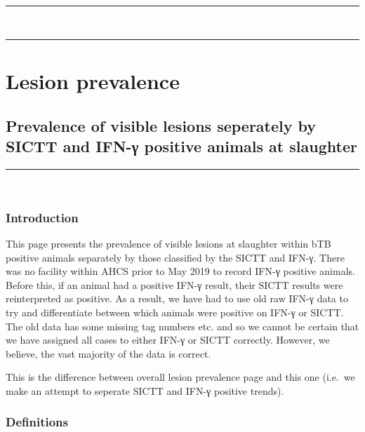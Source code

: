 \documentclass[
  letterpaper,
  DIV=11,
  numbers=noendperiod]{scrreprt}
\begin{document}
\(~\) \(~\)

\begin{center}\rule{0.5\linewidth}{0.5pt}\end{center}

\(~\) \(~\)

\begin{center}\rule{0.5\linewidth}{0.5pt}\end{center}

\part{Lesion prevalence}

\chapter{Prevalence of visible lesions seperately by SICTT and IFN-γ
positive animals at slaughter}\label{sec-btblesions}

\begin{center}\rule{0.5\linewidth}{0.5pt}\end{center}

\(~\) \(~\)

\newpage

\section{Introduction}\label{introduction}

This page presents the prevalence of visible lesions at slaughter within
bTB positive animals separately by those classified by the SICTT and
IFN-γ. There was no facility within AHCS prior to May 2019 to record
IFN-γ positive animals. Before this, if an animal had a positive IFN-γ
result, their SICTT results were reinterpreted as positive. As a result,
we have had to use old raw IFN-γ data to try and differentiate between
which animals were positive on IFN-γ or SICTT. The old data has some
missing tag numbers etc. and so we cannot be certain that we have
assigned all cases to either IFN-γ or SICTT correctly. However, we
believe, the vast majority of the data is correct.

This is the difference between overall lesion prevalence page and this
one (i.e.~we make an attempt to seperate SICTT and IFN-γ positive
trends).

\section{Definitions}\label{definitions}
\end{document}
